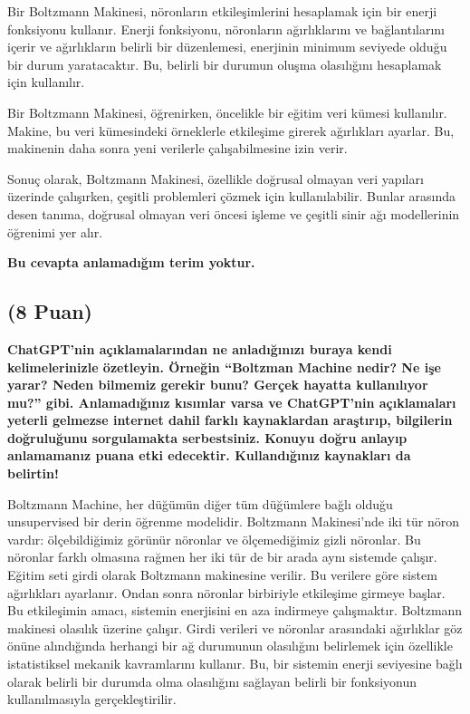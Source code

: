 \documentclass[11pt]{article}
\begin{document}
Bir Boltzmann Makinesi, nöronların etkileşimlerini hesaplamak için bir enerji fonksiyonu kullanır. Enerji fonksiyonu, nöronların ağırlıklarını ve bağlantılarını içerir ve ağırlıkların belirli bir düzenlemesi, enerjinin minimum seviyede olduğu bir durum yaratacaktır. Bu, belirli bir durumun oluşma olasılığını hesaplamak için kullanılır.

Bir Boltzmann Makinesi, öğrenirken, öncelikle bir eğitim veri kümesi kullanılır. Makine, bu veri kümesindeki örneklerle etkileşime girerek ağırlıkları ayarlar. Bu, makinenin daha sonra yeni verilerle çalışabilmesine izin verir.

Sonuç olarak, Boltzmann Makinesi, özellikle doğrusal olmayan veri yapıları üzerinde çalışırken, çeşitli problemleri çözmek için kullanılabilir. Bunlar arasında desen tanıma, doğrusal olmayan veri öncesi işleme ve çeşitli sinir ağı modellerinin öğrenimi yer alır.

\textbf{Bu cevapta anlamadığım terim yoktur.}

\subsection{(8 Puan)} \textbf{ChatGPT’nin açıklamalarından ne anladığınızı buraya kendi kelimelerinizle özetleyin. Örneğin ``Boltzman Machine nedir? Ne işe yarar? Neden bilmemiz gerekir bunu? Gerçek hayatta kullanılıyor mu?'' gibi. Anlamadığınız kısımlar varsa ve ChatGPT’nin açıklamaları yeterli gelmezse internet dahil farklı kaynaklardan araştırıp, bilgilerin doğruluğunu sorgulamakta serbestsiniz. Konuyu doğru anlayıp anlamamanız puana etki edecektir. Kullandığınız kaynakları da belirtin!}

Boltzmann Machine, her düğümün diğer tüm düğümlere bağlı olduğu unsupervised bir derin öğrenme modelidir. Boltzmann Makinesi'nde iki tür nöron vardır: ölçebildiğimiz görünür nöronlar ve ölçemediğimiz gizli nöronlar. Bu nöronlar farklı olmasına rağmen her iki tür de bir arada aynı sistemde çalışır. 
Eğitim seti girdi olarak Boltzmann makinesine verilir. Bu verilere göre sistem ağırlıkları ayarlanır. Ondan sonra nöronlar birbiriyle etkileşime girmeye başlar. Bu etkileşimin amacı, sistemin enerjisini en aza indirmeye çalışmaktır.
Boltzmann makinesi olasılık üzerine çalışır. Girdi verileri ve nöronlar arasındaki ağırlıklar göz önüne alındığında herhangi bir ağ durumunun olasılığını belirlemek için özellikle istatistiksel mekanik kavramlarını kullanır. Bu, bir sistemin enerji seviyesine bağlı olarak belirli bir durumda olma olasılığını sağlayan belirli bir fonksiyonun kullanılmasıyla gerçekleştirilir.
\end{document}
